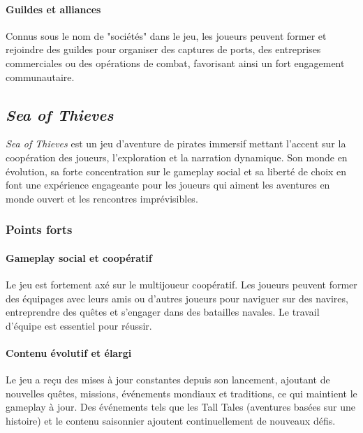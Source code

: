 \documentclass{article}
\begin{document}
\paragraph{Guildes et alliances}\hfill

Connus sous le nom de "sociétés" dans le jeu, les joueurs peuvent former et rejoindre des guildes pour organiser des captures de ports, des entreprises commerciales ou des opérations de combat, favorisant ainsi un fort engagement communautaire.





\subsection{\textit{Sea of Thieves}}\hfill

\textit{Sea of Thieves} est un jeu d’aventure de pirates immersif mettant l'accent sur la coopération des joueurs, l'exploration et la narration dynamique. Son monde en évolution, sa forte concentration sur le gameplay social et sa liberté de choix en font une expérience engageante pour les joueurs qui aiment les aventures en monde ouvert et les rencontres imprévisibles.

\subsubsection{Points forts}
\paragraph{Gameplay social et coopératif}\hfill

Le jeu est fortement axé sur le multijoueur coopératif. Les joueurs peuvent former des équipages avec leurs amis ou d'autres joueurs pour naviguer sur des navires, entreprendre des quêtes et s'engager dans des batailles navales. Le travail d'équipe est essentiel pour réussir.

\paragraph{Contenu évolutif et élargi}\hfill

Le jeu a reçu des mises à jour constantes depuis son lancement, ajoutant de nouvelles quêtes, missions, événements mondiaux et traditions, ce qui maintient le gameplay à jour. Des événements tels que les Tall Tales (aventures basées sur une histoire) et le contenu saisonnier ajoutent continuellement de nouveaux défis.
\end{document}

